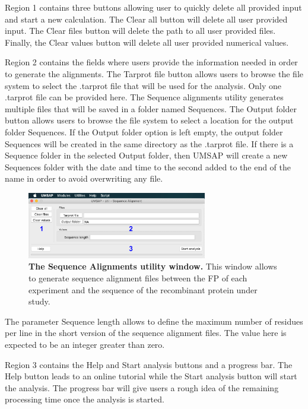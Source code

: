 Region \num{1} contains three buttons allowing user to quickly delete all provided input and start a new calculation. The Clear all button will delete all user provided input. The Clear files button will delete the path to all user provided files. Finally, the Clear values button will delete all user provided numerical values.

Region \num{2} contains the fields where users provide the information needed in order to generate the alignments. The Tarprot file button allows users to browse the file system to select the .tarprot file that will be used for the analysis. Only one .tarprot file can be provided here. The Sequence alignments utility generates multiple files that will be saved in a folder named Sequences. The Output folder button allows users to browse the file system to select a location for the output folder Sequences. If the Output folder option is left empty, the output folder Sequences will be created in the same directory as the .tarprot file. If there is a Sequence folder in the selected Output folder, then UMSAP will create a new Sequences folder with the date and time to the second added to the end of the name in order to avoid overwriting any file. 

\begin{figure}[h]
	\centering
	\includegraphics[width=0.7\textwidth]{./IMAGES/UTIL-SEQ-WINDOW/util-seq.jpg}	    
	\caption[The Sequence Alignments utility window]{\textbf{The Sequence Alignments utility window.} This window allows to generate sequence alignment files between the FP of each experiment and the sequence of the recombinant protein under study.} 
	\label{fig:utilSeqAli}
	\vspace{-5pt} 	
\end{figure} 

The parameter Sequence length allows to define the maximum number of residues per line in the short version of the sequence alignment files. The value here is expected to be an integer greater than zero.

Region \num{3} contains the Help and Start analysis buttons and a progress bar. The Help button leads to an online tutorial while the Start analysis button will start the analysis. The progress bar will give users a rough idea of the remaining processing time once the analysis is started.

